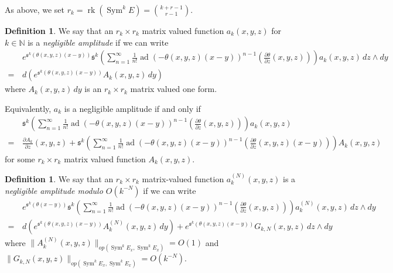 \documentclass{amsart}
\theoremstyle{definition}
\newtheorem{defn}[thm]{Definition}
\theoremstyle{remark}
\numberwithin{equation}{section}
\newcommand{\deriv}[2]{\frac{\partial #1}{\partial #2}}
\DeclareMathOperator{\Sym}{Sym}
\DeclareMathOperator{\rk}{rk}
\DeclareMathOperator{\ad}{ad}
\begin{document}
As above, we set $r_k = \rk(\Sym^k E) = \binom{k+r-1}{r-1}$.  

\begin{defn}
We say that an $r_k \times r_k$ matrix valued function $a_k(x,y,z)$ for $k \in \mathbb{N}$ is a \emph{negligible amplitude} if we can write
\begin{equation*}
\begin{split}
& e^{\mathfrak{s}^k(\theta (x,y,z)(x-y))} \mathfrak{s}^k \left ( \sum_{n=1}^\infty \frac{1}{n!} \ad \left (- \theta(x,y,z) (x-y) \right )^{n-1} \left ( \deriv{\theta}{z} (x,y,z)\right )\right )a_k(x,y,z) \,dz \wedge dy \\ 
= \hspace{2pt} & d (e^{\mathfrak{s}^k (\theta(x,y,z) (x-y))} A_k(x,y,z) \,dy)
\end{split}
\end{equation*}
where $A_k(x,y,z) \,dy$ is an $r_k \times r_k$ matrix valued one form.
\end{defn}


Equivalently, $a_k$ is a negligible amplitude if and only if 
\begin{equation*}
    \begin{split}
    &   \mathfrak{s}^k \left ( \sum_{n=1}^\infty \frac{1}{n!} \ad \left (-\theta(x,y,z) (x-y) \right )^{n-1} \left ( \deriv{\theta}{z}(x,y,z) \right )\right ) a_k(x,y,z) \\
        = \hspace{2pt} & \deriv{A_k}{z}(x,y,z) + \mathfrak{s}^k \left ( \sum_{n=1}^\infty \frac{1}{n!} \ad \left (-\theta (x,y,z)(x-y) \right )^{n-1} \left ( \deriv{\theta}{z}(x,y,z)(x-y) \right )\right ) A_k(x,y,z)
    \end{split}
\end{equation*}
for some $r_k \times r_k$ matrix valued function $A_k(x,y,z)$. 

\begin{defn}
We say that an $r_k \times r_k$ matrix-valued function $a^{(N)}_k(x,y,z)$ is a \emph{negligible amplitude modulo $O(k^{-N})$} if we can write
\begin{equation*}
    \begin{split}
    & e^{\mathfrak{s}^k (\theta (x-y))} \mathfrak{s}^k \left ( \sum_{n=1}^\infty \frac{1}{n!} \ad \left (- \theta (x,y,z) (x-y) \right )^{n-1} \left ( \deriv{\theta}{z} (x,y,z) \right )\right )a^{(N)}_k(x,y,z) \,dz \wedge dy \\
        = \hspace{2pt} & d (e^{\mathfrak{s}^k (\theta (x,y,z) (x-y))} A^{(N)}_k(x,y,z) \,dy) + e^{\mathfrak{s}^k(\theta (x,y,z) (x-y))} G_{k,N}(x,y,z) \,dz \wedge dy
    \end{split}
\end{equation*}
where $\|A^{(N)}_k(x,y,z)\|_{op(\Sym^kE_x,\Sym^kE_x)} = O(1)$ and $\|G_{k,N}(x,y,z)\|_{op(\Sym^kE_x,\Sym^kE_x)} = O(k^{-N})$.
\end{defn}
\end{document}

